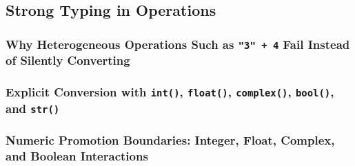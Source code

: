 \subsection{Strong Typing in Operations}
\subsubsection{Why Heterogeneous Operations Such as \texttt{"3" + 4} Fail Instead of Silently Converting}
\subsubsection{Explicit Conversion with \texttt{int()}, \texttt{float()}, \texttt{complex()}, \texttt{bool()}, and \texttt{str()}}
\subsubsection{Numeric Promotion Boundaries: Integer, Float, Complex, and Boolean Interactions}
